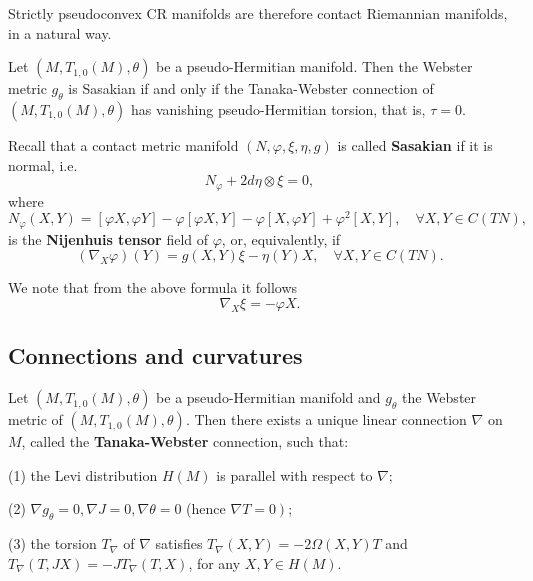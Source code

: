 \begin{example}
    Strictly pseudoconvex CR manifolds are therefore contact Riemannian manifolds, in a natural way.
\end{example}
\begin{theorem}
   Let $\left(M, T_{1,0}(M), \theta\right)$ be a pseudo-Hermitian manifold. Then the Webster metric $g_\theta$ is Sasakian if and only if the Tanaka-Webster connection of $\left(M, T_{1,0}(M), \theta\right)$ has vanishing pseudo-Hermitian torsion, that is, $\tau=0$.
\end{theorem}

Recall that
    a contact metric manifold $(N, \varphi, \xi, \eta, g)$ is called \textbf{Sasakian} if it is normal, i.e.
$$
N_{\varphi}+2 d \eta \otimes \xi=0,
$$
where
\begin{equation}\label{eq:Jtorsion}
    N_{\varphi}(X, Y)=[\varphi X, \varphi Y]-\varphi[\varphi X, Y]-\varphi[X, \varphi Y]+\varphi^2[X, Y], \quad \forall X, Y \in C(T N),
\end{equation}
is the \textbf{Nijenhuis tensor} field of $\varphi$, or, equivalently, if
\begin{equation}
    \left(\nabla_X \varphi\right)(Y)=g(X, Y) \xi-\eta(Y) X, \quad \forall X, Y \in C(T N) .
\end{equation}

\begin{remark}
    We note that from the above formula it follows 
    \begin{equation}
        \nabla_X \xi=-\varphi X.
    \end{equation}
\end{remark}

\subsection{Connections and curvatures}

\begin{theorem}
 Let $\left(M, T_{1,0}(M), \theta\right)$ be a pseudo-Hermitian manifold and $g_\theta$ the Webster metric of $\left(M, T_{1,0}(M), \theta\right)$. Then there exists a unique linear connection $\nabla$ on $M$, called the \textbf{Tanaka-Webster} connection, such that:
 
(1) the Levi distribution $H(M)$ is parallel with respect to $\nabla$;

(2) $\nabla g_\theta=0, \nabla J=0, \nabla \theta=0$ (hence $\left.\nabla T=0\right)$;

(3) the torsion $T_{\nabla}$ of $\nabla$ satisfies $T_{\nabla}(X, Y)=-2 \Omega(X, Y) T$ and $T_{\nabla}(T, J X)=-J T_{\nabla}(T, X)$, for any $X, Y \in H(M)$.
\end{theorem}

